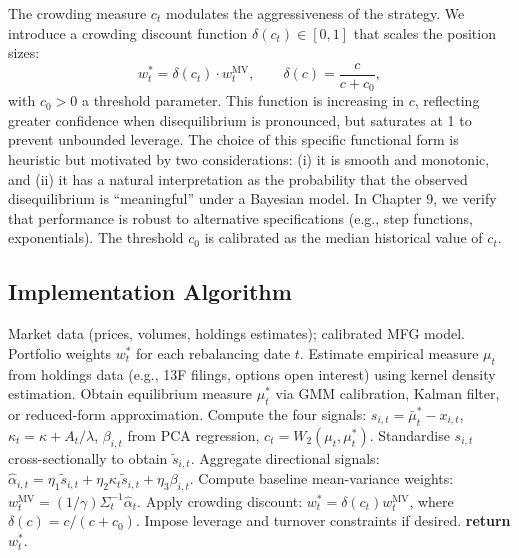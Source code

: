 The crowding measure $c_t$ modulates the aggressiveness of the strategy. We
introduce a crowding discount function $\delta(c_t) \in [0,1]$ that scales the
position sizes:
\begin{equation}
    w_t^* = \delta(c_t) \cdot w_t^{\mathrm{MV}}, \qquad \delta(c) = \frac{c}{c +
    c_0},
    \label{eq:alpha-crowding-discount}
\end{equation}
with $c_0 > 0$ a threshold parameter. This function is increasing in $c$,
reflecting greater confidence when disequilibrium is pronounced, but saturates at 1
to prevent unbounded leverage. The choice of this specific functional form is
heuristic but motivated by two considerations: (i) it is smooth and monotonic, and
(ii) it has a natural interpretation as the probability that the observed
disequilibrium is ``meaningful'' under a Bayesian model. In Chapter 9, we verify
that performance is robust to alternative specifications (e.g., step functions,
exponentials). The threshold $c_0$ is calibrated as the median historical value of
$c_t$.

\subsection{Implementation Algorithm}

\begin{algorithm}[ht]
\caption{MFG-Based Portfolio Construction}
\label{alg:mfg-portfolio-construction}
\begin{algorithmic}[1]
\Require Market data (prices, volumes, holdings estimates); calibrated MFG model.
\Ensure Portfolio weights $w_t^*$ for each rebalancing date $t$.
\State Estimate empirical measure $\mu_t$ from holdings data (e.g., 13F filings,
    options open interest) using kernel density estimation.
\State Obtain equilibrium measure $\mu_t^*$ via GMM calibration, Kalman filter, or
    reduced-form approximation.
\State Compute the four signals: $s_{i,t} = \bar\mu_t^* - x_{i,t}$, $\kappa_t =
    \kappa + A_t/\lambda$, $\beta_{i,t}$ from PCA regression, $c_t = W_2(\mu_t,
    \mu_t^*)$.
\State Standardise $s_{i,t}$ cross-sectionally to obtain $\tilde{s}_{i,t}$.
\State Aggregate directional signals: $\hat\alpha_{i,t} = \eta_1 \tilde{s}_{i,t} +
    \eta_2 \kappa_t \tilde{s}_{i,t} + \eta_3 \beta_{i,t}$.
\State Compute baseline mean-variance weights: $w_t^{\mathrm{MV}} = (1/\gamma)
    \Sigma_t^{-1} \hat\alpha_t$.
\State Apply crowding discount: $w_t^* = \delta(c_t) w_t^{\mathrm{MV}}$, where
    $\delta(c) = c/(c+c_0)$.
\State Impose leverage and turnover constraints if desired.
\State \textbf{return} $w_t^*$.
\end{algorithmic}
\end{algorithm}



